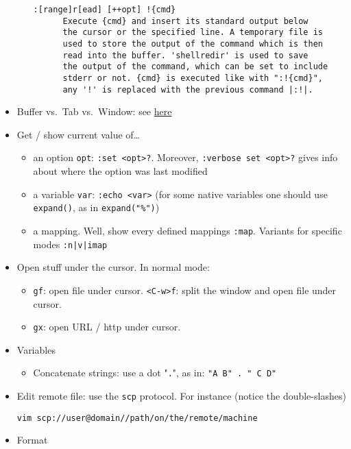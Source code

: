 \documentclass[a4paper,12pt,%
              final%
              ]{article}
\begin{document}
\begin{itemize}
\begin{itemize}
\begin{verbatim}
:[range]r[ead] [++opt] !{cmd}
      Execute {cmd} and insert its standard output below
      the cursor or the specified line. A temporary file is
      used to store the output of the command which is then
      read into the buffer. 'shellredir' is used to save
      the output of the command, which can be set to include
      stderr or not. {cmd} is executed like with ":!{cmd}",
      any '!' is replaced with the previous command |:!|.
\end{verbatim}
    \end{itemize}
  \item Buffer vs.~Tab vs.~Window: see
    \href{https://joshldavis.com/2014/04/05/vim-tab-madness-buffers-vs-tabs/}{here}
  \item Get / show current value of\ldots
    \begin{itemize}
      \item an option \verb|opt|: \verb|:set <opt>?|. Moreover,
        \verb|:verbose set <opt>?| gives info about where the option was last
        modified
      \item a variable \verb|var|: \verb|:echo <var>| (for some native variables one
        should use \verb|expand()|, as in \verb|expand("%")|)
      \item a mapping. Well, show every defined mappings \verb|:map|. Variants for
        specific modes \verb!:n|v|imap!
    \end{itemize}
  \item Open stuff under the cursor. In normal mode:
    \begin{itemize}
      \item \texttt{gf}: open file under cursor. \texttt{<C-w>f}: split the window
        and open file under cursor.
      \item \texttt{gx}: open URL / http under cursor.
    \end{itemize}
  \item Variables
    \begin{itemize}
      \item Concatenate strings: use a dot "\texttt{.}", as in: \verb|"A B" . " C D"|
    \end{itemize}
  \item Edit remote file: use the \texttt{scp} protocol. For instance (notice the
    double-slashes)
\begin{verbatim}
vim scp://user@domain//path/on/the/remote/machine
\end{verbatim}
  \item Format
    \begin{itemize}

\end{itemize}
\end{itemize}
\end{document}
